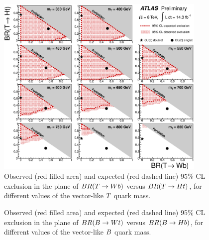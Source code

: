\begin{figure}[htbp]
\centering
\includegraphics[width=0.9\textwidth]{results/figures/htx/lim_2D.eps}
\caption{
Observed (red filled area) and expected (red dashed line) 95\% CL exclusion in the plane of
$BR(\T \to Wb)$ versus $BR(\T \to Ht)$, for different values of the vector-like $\T$ quark mass.
\label{fig:limits2D_htx}}
\end{figure}


\begin{figure}[htb]\begin{center}
	\caption{Observed (red filled area) and expected (red dashed line) 95\% CL exclusion in the plane of
        $BR(\B \to Wt)$ versus $BR(\B \to Hb)$, for different values of the vector-like $\B$ quark mass.
        \label{fig:limits2D_htxvlb}}
\end{center}\end{figure}

